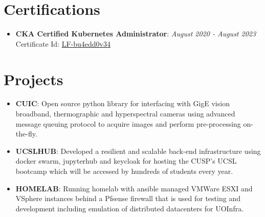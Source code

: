 \documentclass[letterpaper,10.5pt]{article}
\newcommand{\resumeItem}[2]{
\item\small{
\textbf{#1}{: #2 \vspace{-2pt}}
}
}
\newcommand{\resumeSubItem}[2]{\resumeItem{#1}{#2}\vspace{-4pt}}
\newcommand{\resumeSubHeadingListStart}{\begin{itemize}[leftmargin=*]}
\newcommand{\resumeSubHeadingListEnd}{\end{itemize}}
\begin{document}
\section{\color[HTML]{DF691A} Certifications}
\resumeSubHeadingListStart
\resumeSubItem{CKA Certified Kubernetes Administrator} \null\hfill \textit{\small{August 2020 - August 2023}}
\newline
\newline
{Certificate Id: \href{https://www.youracclaim.com/badges/ce11744e-269f-459d-836a-9ce4c11ff2c9}{LF-bu4edd0v34}}
\resumeSubHeadingListEnd

\section{\color[HTML]{DF691A} Projects}
\resumeSubHeadingListStart
\resumeSubItem{CUIC}
{Open source python library for interfacing with GigE vision broadband, thermographic and hyperspectral cameras using advanced message queuing protocol to acquire images and perform pre-processing on-the-fly.}
\resumeSubItem{UCSLHUB}
{Developed a resilient and scalable back-end infrastructure using docker swarm, jupyterhub and keycloak for hosting the CUSP's UCSL bootcamp which will be accessed by hundreds of students every year.}
\resumeSubItem{HOMELAB}
{Running homelab with ansible managed VMWare ESXI and VSphere instances behind a Pfsense firewall that is used for testing and development including emulation of distributed datacenters for UOInfra.}
\resumeSubHeadingListEnd
\end{document}
